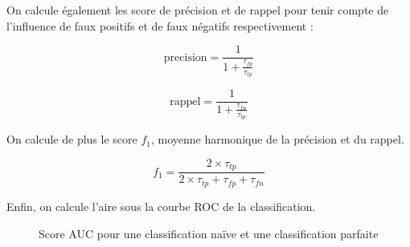             On calcule également les score de précision et de rappel pour tenir compte de
            l'influence de faux positifs et de faux négatifs respectivement :

            \begin{equation}
                \mathrm{precision}=\frac{1}{1+\displaystyle{\frac{\tau_{fp}}{\tau_{tp}}}}
            \end{equation}

            \begin{equation}
                \mathrm{rappel}=\frac{1}{1+\displaystyle{\frac{\tau_{fn}}{\tau_{tp}}}}
            \end{equation}

            On calcule de plus le score $f_1$, moyenne harmonique de la précision et du rappel.

            \begin{equation}
                f_1=\frac{2\times \tau_{tp}}{2\times \tau_{tp} + \tau_{fp} + \tau_{fn}}
            \end{equation}

            Enfin, on calcule l'aire sous la courbe ROC de la classification.

            \begin{figure}[H]
                \centering
                \caption{Score AUC pour une classification naïve et une classification parfaite}
            \end{figure}

